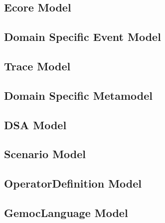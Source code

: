 \documentclass{gemoc} %
\begin{document}
\subsection{Ecore Model}


\subsection{Domain Specific Event Model}


\subsection{Trace Model}


\subsection{Domain Specific Metamodel}


\subsection{DSA Model}


\subsection{Scenario Model}


\subsection{OperatorDefinition Model}


\subsection{GemocLanguage Model}
\end{document}
